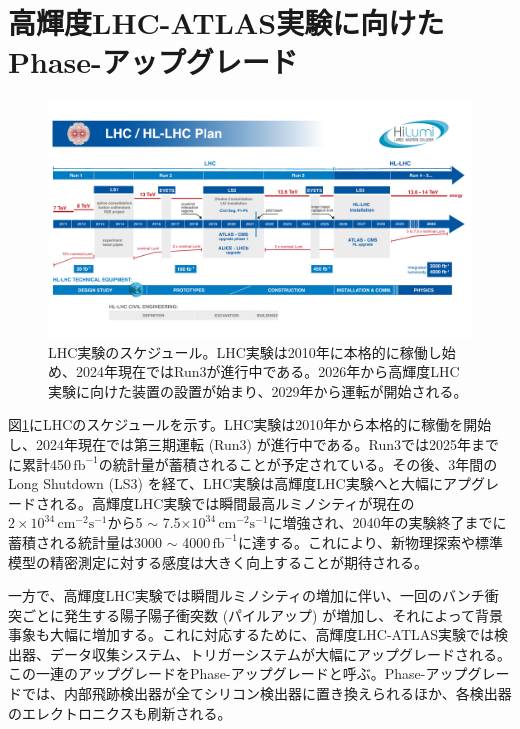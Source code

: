 

\section{高輝度LHC-ATLAS実験に向けたPhase-\two アップグレード}
\label{sec_intro_phase2upgrade}

\begin{figure} 
\centering
\includegraphics[width=16cm]{fig/Intro/LHCschedule.pdf}
\caption[LHC実験のスケージュール]{LHC実験のスケジュール\cite{cern_hllhc_industry}。LHC実験は2010年に本格的に稼働し始め、2024年現在ではRun3が進行中である。2026年から高輝度LHC実験に向けた装置の設置が始まり、2029年から運転が開始される。}
\label{LHCschedule}
\end{figure}

図\ref{LHCschedule}にLHCのスケジュールを示す。LHC実験は2010年から本格的に稼働を開始し、2024年現在では第三期運転 (Run3) が進行中である。Run3では2025年までに累計450\,$\mathrm{fb}^{-1}$の統計量が蓄積されることが予定されている。その後、3年間のLong Shutdown (LS3) を経て、LHC実験は高輝度LHC実験へと大幅にアプグレードされる。高輝度LHC実験では瞬間最高ルミノシティが現在の$2\times10^{34}\,\mathrm{cm}^{-2}\mathrm{s}^{-1}$から5 $\sim$ 7.5$\times10^{34}\,\mathrm{cm}^{-2}\mathrm{s}^{-1}$に増強され、2040年の実験終了までに蓄積される統計量は3000  $\sim$ 4000\,$\mathrm{fb}^{-1}$に達する。これにより、新物理探索や標準模型の精密測定に対する感度は大きく向上することが期待される。

一方で、高輝度LHC実験では瞬間ルミノシティの増加に伴い、一回のバンチ衝突ごとに発生する陽子陽子衝突数 (パイルアップ) が増加し、それによって背景事象も大幅に増加する。これに対応するために、高輝度LHC-ATLAS実験では検出器、データ収集システム、トリガーシステムが大幅にアップグレードされる。この一連のアップグレードをPhase-\two アップグレードと呼ぶ。Phase-\two アップグレードでは、内部飛跡検出器が全てシリコン検出器に置き換えられるほか、各検出器のエレクトロニクスも刷新される。

